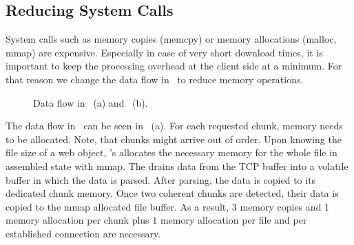 \subsection{Reducing System Calls}
\label{sec:system-calls} 

System calls such as memory copies (\eg memcpy) or memory allocations (\eg malloc, mmap) are expensive. 
Especially in case of very short download times, it is important to keep the processing overhead at the client side at a minimum. 
For that reason we change the data flow in \protonew~to reduce memory operations. 

\begin{figure}[!htb]
		\begin{minipage}[t]{0.8\linewidth}
		\begin{center}
        \end{center}
        \end{minipage}
		\caption{\label{fig:implementation-memory-flow} Data flow in \protoold~(a) and \protonew~(b).}
\vspace*{-0.3cm}
\end{figure}

The data flow in \protoold~can be seen in~ (a). 
For each requested chunk, memory needs to be allocated. 
Note, that chunks might arrive out of order. 
Upon knowing the file size of a web object, \protoold's  allocates the necessary memory for the whole file in assembled state with mmap. 
The  drains data from the TCP buffer into a volatile buffer in which the data is parsed. 
After parsing, the data is copied to its dedicated chunk memory. 
Once two coherent chunks are detected, their data is copied to the mmap allocated file buffer. 
As a result, $3$ memory copies and $1$ memory allocation per chunk plus $1$ memory allocation per file and per established connection are necessary. 

